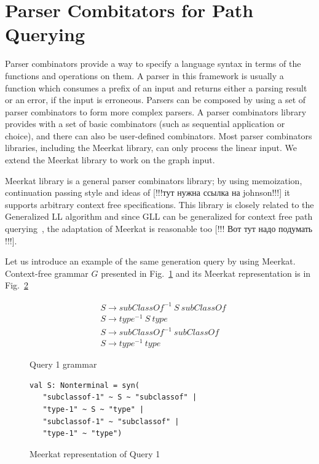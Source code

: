 \section{Parser Combitators for Path Querying}

Parser combinators provide a way to specify a language syntax in terms of the functions and operations on them. A parser in this framework is usually a function which consumes a prefix of an input and returns either a parsing result or an error, if the input is erroneous. Parsers can be composed by using a set of parser combinators to form more complex parsers. A parser combinators library provides with a set of basic combinators (such as sequential application or choice), and there can also be user-defined combinators. Most parser combinators libraries, including the Meerkat library, can only process the linear input. We extend the Meerkat library to work on the graph input.

Meerkat library is a general parser combinators library; by using memoization, continuation passing style and ideas of [!!!тут нужна ссылка на johnson!!!] it supports arbitrary context free specifications. This library is closely related to the Generalized LL algorithm and since GLL can be generalized for context free path querying~\cite{GrigorevR16}, the adaptation of Meerkat is reasonable too [!!! Вот тут надо подумать !!!]. 

Let us introduce an example of the same generation query by using Meerkat.
Context-free grammar $G$ presented in Fig.~\ref{fig:query1} and its Meerkat representation is in Fig.~\ref{fig:query1Meerkat}

\begin{figure}[h]
\begin{align*}
& S \rightarrow subClassOf^{-1}\ S\ subClassOf\\
& S \rightarrow type^{-1}\ S\ type\\
& S \rightarrow subClassOf^{-1}\ subClassOf\\
& S \rightarrow type^{-1}\ type
\end{align*}
\caption{Query 1 grammar}
\label{fig:query1}
\end{figure}

\begin{figure}[h]
\begin{lstlisting}
val S: Nonterminal = syn(
   "subclassof-1" ~ S ~ "subclassof" |
   "type-1" ~ S ~ "type" |
   "subclassof-1" ~ "subclassof" |
   "type-1" ~ "type")
\end{lstlisting}
\caption{Meerkat representation of Query 1}
\label{fig:query1Meerkat}
\end{figure}

